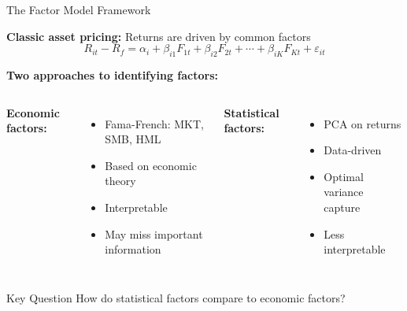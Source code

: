 \documentclass[10pt]{beamer}
\begin{document}
\begin{frame}{The Factor Model Framework}

  \textbf{Classic asset pricing:} Returns are driven by common factors
  \[
  R_{it} - R_f = \alpha_i + \beta_{i1} F_{1t} + \beta_{i2} F_{2t} + \cdots + \beta_{iK} F_{Kt} + \varepsilon_{it}
  \]

  \vspace{0.5em}
  \textbf{Two approaches to identifying factors:}

  \vspace{0.5em}
  \begin{columns}[T]
    \textbf{Economic factors:}
    \begin{itemize}
      \item Fama-French: MKT, SMB, HML
      \item Based on economic theory
      \item Interpretable
      \item May miss important information
    \end{itemize}

    \textbf{Statistical factors:}
    \begin{itemize}
      \item PCA on returns
      \item Data-driven
      \item Optimal variance capture
      \item Less interpretable
    \end{itemize}
  \end{columns}

  \vspace{1em}
  \begin{block}{Key Question}
    How do statistical factors compare to economic factors?
  \end{block}
\end{frame}

\end{document}

